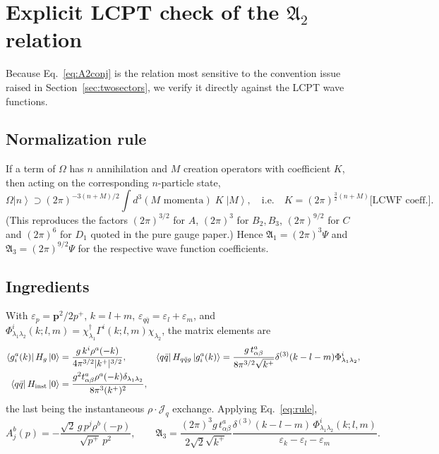 \documentclass[11pt]{article}
\newcommand{\mf}{\mathfrak}
\newcommand{\eps}{\varepsilon}
\newcommand{\dg}{\dagger}
\newcommand{\dthree}{\delta^{(3)}}
\newcommand{\ket}[1]{\left|#1\right\rangle}
\newcommand{\bra}[1]{\left\langle#1\right|}
\newcommand{\vac}{\ket{0}}
\newcommand{\OM}{\Omega}
\begin{document}
\appendix
\section{Explicit LCPT check of the $\mf A_{2}$ relation}
\label{app:check}

Because Eq.~\eqref{eq:A2conj} is the relation most sensitive to the convention issue raised in
Section~\ref{sec:twosectors}, we verify it directly against the LCPT wave functions.

\subsection{Normalization rule}

If a term of $\OM$ has $n$ annihilation and $M$ creation operators with coefficient $K$, then
acting on the corresponding $n$-particle state,
\begin{equation}
\OM\ket{n}\supset(2\pi)^{-3(n+M)/2}\!\int\! d^{3}(\text{$M$ momenta})\;K\;\ket{M},
\quad\text{i.e.}\quad
K=(2\pi)^{\frac{3}{2}(n+M)}\big[\text{LCWF coeff.}\big].
\label{eq:rule}
\end{equation}
(This reproduces the factors $(2\pi)^{3/2}$ for $A$, $(2\pi)^{3}$ for $B_{2},B_{3}$,
$(2\pi)^{9/2}$ for $C$ and $(2\pi)^{6}$ for $D_{1}$ quoted in the pure gauge paper.) Hence
$\mf A_{1}=(2\pi)^{3}\Psi$ and $\mf A_{3}=(2\pi)^{9/2}\Psi$ for the respective wave function
coefficients.

\subsection{Ingredients}

With $\eps_{p}=\bm p^{2}/2p^{+}$, $k=l+m$, $\eps_{q\bar q}=\eps_{l}+\eps_{m}$, and
$\Phi^{i}_{\lambda_1\lambda_2}(k;l,m)=\chi^{\dg}_{\lambda_1}\Gamma^{i}(k;l,m)\chi_{\lambda_2}$,
the matrix elements are
\begin{align}
\bra{g^{a}_{i}(k)}H_{g}\vac&=\frac{g\,k^{i}\rho^{a}(-k)}{4\pi^{3/2}|k^{+}|^{3/2}},
&
\bra{q\bar q}H_{q\bar qg}\ket{g^{a}_{i}(k)}&=\frac{g\,t^{a}_{\alpha\beta}}{8\pi^{3/2}\sqrt{k^{+}}}
\dthree(k-l-m)\Phi^{i}_{\lambda_1\lambda_2},
\nonumber\\
\bra{q\bar q}H_{\rm inst}\vac&=\frac{g^{2}t^{a}_{\alpha\beta}\rho^{a}(-k)\delta_{\lambda_1\lambda_2}}
{8\pi^{3}(k^{+})^{2}}, &&
\end{align}
the last being the instantaneous $\rho\cdot\mathcal J_{q}$ exchange. Applying
Eq.~\eqref{eq:rule},
\begin{equation}
A^{b}_{j}(p)=-\frac{\sqrt2\,g\,p^{j}\rho^{b}(-p)}{\sqrt{p^{+}}\,p^{2}},
\qquad
\mf A_{3}=\frac{(2\pi)^{3}g\,t^{a}_{\alpha\beta}}{2\sqrt2\sqrt{k^{+}}}
\frac{\dthree(k-l-m)\,\Phi^{i}_{\lambda_1\lambda_2}(k;l,m)}{\eps_{k}-\eps_{l}-\eps_{m}} .
\end{equation}
\end{document}
